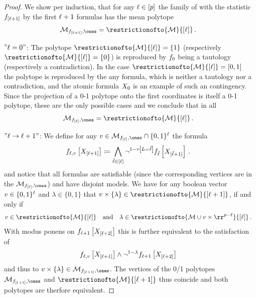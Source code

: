 \begin{proof}
    We show per induction, that for any $\ell\in[p]$ the family of \HybridLogicNetworks{} with the statistic $f_{[\ell+1]}$ by the first $\ell+1$ formulas has the mean polytope
    \begin{align}
        \label{eq:HLNindConTBS}
        \meansetof{\formulaof{[\selindex+1]},\trivbm}
        = \restrictionofto{\meanset}{[\selindex]} \, .
    \end{align}

    $"\ell=0"$: The polytope $\restrictionofto{\meanset}{[\selindex]}=\{1\}$ (respectively $\restrictionofto{\meanset}{[\selindex]}=\{0\}$) is reproduced by $f_{0}$ being a tautology (respectively a contradiction).
    In the case $\restrictionofto{\meanset}{[\selindex]}=[0,1]$ the polytope is reproduced by the any formula, which is neither a tautology nor a contradiction, and the atomic formula $X_{0}$ is an example of such an contingency.
    Since the projection of a 0-1 polytope onto the first coordinates is itself a 0-1 polytope, these are the only possible cases and we conclude that in all
    \begin{align*}
        \meansetof{\formulaof{[\selindex]},\trivbm}
        = \restrictionofto{\meanset}{[\selindex]} \, .
    \end{align*}

    $"\ell\rightarrow\ell+1"$:
    We define for any $\imelement\in\meansetof{\formulaof{[\selindex]},\trivbm}\cap\{0,1\}^{\selindex}$ the formula
    \begin{align*}
        f_{\ell,v}\left[X_{[\ell+1]}\right]\coloneqq
        \bigwedge_{\tilde{\ell}\in[\ell]} \lnot^{1-v\left[L=\tilde{\ell}\right]} f_{\tilde{\ell}}\left[X_{[\tilde{\ell}+1]}\right] \, .
    \end{align*}
    and notice that all formulas are satisfiable (since the corresponding vertices are in the $\meansetof{\formulaof{[\selindex]},\trivbm}$) and have disjoint models.
    We have for any boolean vector $v\in\{0,1\}^{\ell}$ and $\lambda\in\{0,1\}$ that $\imelement\times\{\lambda\}\in\restrictionofto{\meanset}{[\selindex+1]}$, if and only if
    \begin{align*}
        \imelement \in \restrictionofto{\meanset}{[\selindex]} \quad \text{and} \quad
        \lambda \in \restrictionofto{\meanset\cup\imelement\times\rr^{\seldim-\selindex}}{[\selindex]} \, .
    \end{align*}
    With modus ponens on $f_{\ell+1}\left[X_{[\ell+2]}\right]$ this is further equivalent to the satisfaction of
    \begin{align*}
        f_{\ell,v}\left[X_{[\ell+1]}\right] \land \lnot^{1-\lambda}f_{\ell+1}\left[X_{[\ell+2]}\right]
    \end{align*}
    and thus to $\imelement\times\{\lambda\}\in\meansetof{\formulaof{[\selindex+1]},\trivbm}$.
    The vertices of the 0/1 polytopes $\meansetof{\formulaof{[\selindex+1]},\trivbm}$ and $\restrictionofto{\meanset}{[\selindex+1]}$ thus coincide and both polytopes are therfore equivalent.


\end{proof}
